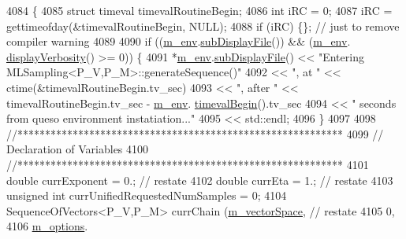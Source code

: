 \begin{DoxyCode}
4084 \{
4085   \textcolor{keyword}{struct }timeval timevalRoutineBegin;
4086   \textcolor{keywordtype}{int} iRC = 0;
4087   iRC = gettimeofday(&timevalRoutineBegin, NULL);
4088   \textcolor{keywordflow}{if} (iRC) \{\}; \textcolor{comment}{// just to remove compiler warning}
4089 
4090   \textcolor{keywordflow}{if} ((\hyperlink{class_q_u_e_s_o_1_1_m_l_sampling_a13f1ca4fe9f94822fe572a743eaced1d}{m\_env}.\hyperlink{class_q_u_e_s_o_1_1_base_environment_a8a0064746ae8dddfece4229b9ad374d6}{subDisplayFile}()) && (\hyperlink{class_q_u_e_s_o_1_1_m_l_sampling_a13f1ca4fe9f94822fe572a743eaced1d}{m\_env}.
      \hyperlink{class_q_u_e_s_o_1_1_base_environment_a1fe5f244fc0316a0ab3e37463f108b96}{displayVerbosity}() >= 0)) \{
4091     *\hyperlink{class_q_u_e_s_o_1_1_m_l_sampling_a13f1ca4fe9f94822fe572a743eaced1d}{m\_env}.\hyperlink{class_q_u_e_s_o_1_1_base_environment_a8a0064746ae8dddfece4229b9ad374d6}{subDisplayFile}() << \textcolor{stringliteral}{"Entering MLSampling<P\_V,P\_M>::generateSequence()"}
4092                             << \textcolor{stringliteral}{", at  "}   << ctime(&timevalRoutineBegin.tv\_sec)
4093                             << \textcolor{stringliteral}{", after "} << timevalRoutineBegin.tv\_sec - \hyperlink{class_q_u_e_s_o_1_1_m_l_sampling_a13f1ca4fe9f94822fe572a743eaced1d}{m\_env}.
      \hyperlink{class_q_u_e_s_o_1_1_base_environment_a1adcf7ca2d95e75a29360bcfe091cd65}{timevalBegin}().tv\_sec
4094                             << \textcolor{stringliteral}{" seconds from queso environment instatiation..."}
4095                             << std::endl;
4096   \}
4097 
4098   \textcolor{comment}{//***********************************************************}
4099   \textcolor{comment}{// Declaration of Variables}
4100   \textcolor{comment}{//***********************************************************}
4101   \textcolor{keywordtype}{double}                            currExponent                   = 0.;   \textcolor{comment}{// restate}
4102   \textcolor{keywordtype}{double}                            currEta                        = 1.;   \textcolor{comment}{// restate}
4103   \textcolor{keywordtype}{unsigned} \textcolor{keywordtype}{int}                      currUnifiedRequestedNumSamples = 0;
4104   SequenceOfVectors<P\_V,P\_M> currChain              (\hyperlink{class_q_u_e_s_o_1_1_m_l_sampling_a7bc4c72f65ba9166ed94a6e198b0915b}{m\_vectorSpace}, \textcolor{comment}{// restate}
4105                                                             0,
4106                                                             \hyperlink{class_q_u_e_s_o_1_1_m_l_sampling_af8504cc57ec72b3c52833826b2bfff8e}{m\_options}.

\end{DoxyCode}
